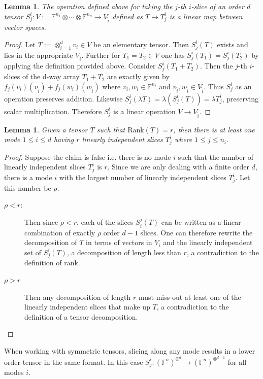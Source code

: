 \documentclass[12pt,a4paper,oneside]{book}
\def\field{\mathbb{F}} %
\def\rank{\text{Rank}} %
\newtheorem{lemma}[theorem]{Lemma}
\theoremstyle{definition}
\begin{document}
\begin{lemma}
    The operation defined above for taking the $j$-th $i$-slice of an order $d$ tensor  $S^i_j: V:= \field^{n_1} \otimes \cdots \otimes \field^{n_d} \to V_{\hat{i}}$ defined as $T \mapsto T^i_j$ is a linear map between vector spaces.
\end{lemma}
\begin{proof}
    Let $T:= \otimes_{i=1}^d v_i \in V$ be an elementary tensor. Then $S^i_j(T)$ exists and lies in the appropriate $V_{\hat{i}}$. Further for $T_1 = T_2 \in V$ one has $S^i_j(T_1) = S^i_j(T_2)$ by applying the definition provided above. Consider $S^i_j(T_1 + T_2)$. Then the $j$-th $i$-slices of the d-way array $T_1 + T_2$ are exactly given by $f_j(v_i)(v_{\hat{i}}) + f_j(w_i)(w_{\hat{i}})$ where $v_i, w_i \in \field^{n_i}$ and $v_{\hat{i}}, w_{\hat{i}} \in V_{\hat{i}}$. Thus $S^i_j$ as an operation preserves addition. Likewise $S^i_j(\lambda T) = \lambda(S^i_j(T)) = \lambda T^i_j$, preserving scalar multiplication. Therefore $S^i_j$ is a linear operation $V \to V_{\hat{i}}$.
\end{proof}
\begin{lemma}
    Given a tensor $T$ such that $\rank(T) = r$, then there is at least one mode $1 \leq i \leq d$ having $r$ linearly independent slices $T^i_j$ where $1 \leq j \leq n_i$.
\end{lemma}
\begin{proof}
    Suppose the claim is false i.e. there is no mode $i$ such that the number of linearly independent slices $T^i_j$ is $r$. Since we are only dealing with a finite order $d$, there is a mode $i$ with the largest number of linearly independent slices $T^i_j$. Let this number be $\rho$.
    \begin{description}
        \item[$\rho < r$:] Then since $\rho < r$, each of the slices $S^j_i(T)$ can be written as a linear combination of exactly $\rho$ order $d-1$ slices. One can therefore rewrite the decomposition of $T$ in terms of vectors in $V_i$ and the linearly independent set of $S^i_j(T)$, a decomposition of length less than $r$, a contradiction to the definition of rank.
        \item[$\rho > r$] Then any decomposition of length $r$ must miss out at least one of the linearly independent slices that make up $T$, a contradiction to the definition of a tensor decomposition. 
    \end{description}
\end{proof}
When working with symmetric tensors, slicing along any mode results in a lower order tensor in the same format. In this case $S^i_j: (\field^n)^{\otimes^d} \to (\field^n)^{\otimes^{d-1}}$ for all modes $i$. 
\end{document}
